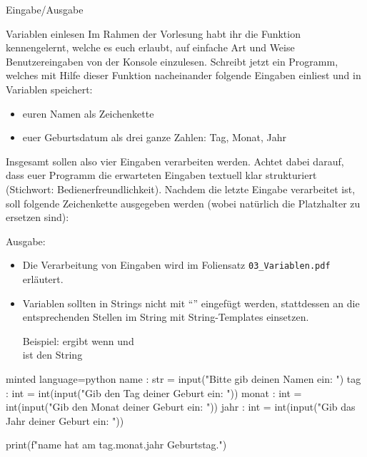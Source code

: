 \begin{task}[points=auto]{Eingabe/Ausgabe }
    \begin{subtask*}[points=0]{Variablen einlesen}
        Im Rahmen der Vorlesung habt ihr die Funktion  kennengelernt, welche es euch erlaubt, auf einfache Art und Weise Benutzereingaben von der Konsole einzulesen. Schreibt jetzt ein Programm, welches mit Hilfe dieser Funktion nacheinander folgende Eingaben einliest und in Variablen speichert:
        \begin{itemize}
            \item euren Namen als Zeichenkette
            \item euer Geburtsdatum als drei ganze Zahlen: Tag, Monat, Jahr
        \end{itemize}
        Insgesamt sollen also vier Eingaben verarbeiten werden. Achtet dabei darauf, dass euer Programm die erwarteten Eingaben textuell klar strukturiert (Stichwort: Bedienerfreundlichkeit).
        Nachdem die letzte Eingabe verarbeitet ist, soll folgende Zeichenkette ausgegeben werden (wobei natürlich die Platzhalter zu ersetzen sind):

        Ausgabe: 

        \begin{hinweise}
            \begin{itemize}
                \item Die Verarbeitung von Eingaben wird im Foliensatz \verb+03_Variablen.pdf+ erläutert.
                \item Variablen sollten in Strings nicht mit \enquote{\pythoninline{+}} eingefügt werden, stattdessen an die entsprechenden Stellen im String mit String-Templates einsetzen.

                    Beispiel:  ergibt wenn  und\\
                     ist den String 
            \end{itemize}
        \end{hinweise}

        \begin{solution}
            \begin{codeBlock}[]{minted language=python}
                name : str = input("Bitte gib deinen Namen ein: ")
                tag : int = int(input("Gib den Tag deiner Geburt ein: "))
                monat : int = int(input("Gib den Monat deiner Geburt ein: "))
                jahr : int = int(input("Gib das Jahr deiner Geburt ein: "))

                print(f"{name} hat am {tag}.{monat}.{jahr} Geburtstag.")
            \end{codeBlock}
        \end{solution}
    \end{subtask*}
\end{task}

